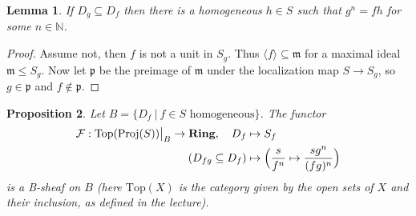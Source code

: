 \documentclass{scrartcl}
\newcommand{\N}{\mathbb{N}}
\newcommand{\p}{\mathfrak{p}}
\newcommand{\m}{\mathfrak{m}}
\renewcommand{\m}{\mathfrak{m}}
\newcommand{\Ring}{\mathrm{\textbf{Ring}}}
\newcommand{\Top}{\mathrm{Top}}
\newcommand{\Proj}{\mathrm{Proj}}
\newcommand\restr[2]{{
    \left.\kern-\nulldelimiterspace
    #1
    \vphantom{\big|}
    \right|_{#2}
}}
\newtheorem{prop}{Proposition}
\newtheorem{lemma}[prop]{Lemma}
\theoremstyle{definition}
\begin{document}
\begin{lemma}
    If $D_g \subseteq D_f$ then there is a homogeneous $h \in S$ such that $g^n = fh$ for some $n \in \N$.
\end{lemma}
\begin{proof}
    Assume not, then $f$ is not a unit in $S_g$.
    Thus $\langle f \rangle \subseteq \m$ for a maximal ideal $\m \leq S_g$.
    Now let $\p$ be the preimage of $\m$ under the localization map $S \to S_g$, so $g \in \p$ and $f \notin \p$.
    
\end{proof}
\begin{prop}
    Let $B = \{ D_f \ | \ \text{$f \in S$ homogeneous}\}$.
    The functor
    \begin{align*}
        \mathcal{F}: \restr{\Top(\Proj(S))}{B} \to \Ring, \quad D_f &\mapsto S_f \\
        (D_{fg} \subseteq D_f) &\mapsto \Bigl( \frac s {f^n} \mapsto \frac {sg^n} {(fg)^n} \Bigr)
    \end{align*}
    is a B-sheaf on $B$ (here $\Top(X)$ is the category given by the open sets of $X$ and their inclusion, as defined in the lecture).
\end{prop}

\printbibliography
\end{document}
